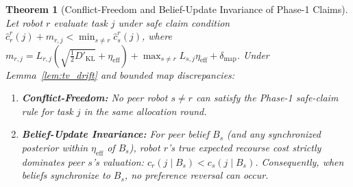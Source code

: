 \documentclass[lettersize,journal]{IEEEtran}
\newtheorem{theorem}{Theorem}
\begin{document}
\begin{theorem}[Conflict-Freedom and Belief-Update Invariance of Phase-1 Claims]
Let robot $r$ evaluate task $j$ under safe claim condition $\hat{c}_r^r(j) + m_{r, j} < \min_{s \ne r} \hat{c}_s^r(j)$, where $m_{r, j} = L_{r, j} (\sqrt{\frac{1}{2} D'_{\text{KL}}} + \eta_{\text{eff}}) + \max_{s \ne r} L_{s, j} \eta_{\text{eff}} + \delta_{\text{map}}$. Under Lemma~\ref{lem:tv_drift} and bounded map discrepancies:
\begin{enumerate}
    \item \textbf{Conflict-Freedom:} No peer robot $s \ne r$ can satisfy the Phase-1 safe-claim rule for task $j$ in the same allocation round.
    \item \textbf{Belief-Update Invariance:} For peer belief $B_s$ (and any synchronized posterior within $\eta_{\text{eff}}$ of $B_s$), robot $r$'s true expected recourse cost strictly dominates peer $s$'s valuation: $c_r(j \mid B_s) < c_s(j \mid B_s)$. Consequently, when beliefs synchronize to $B_s$, no preference reversal can occur.
\end{enumerate}
\label{thm:conflict_freedom}
\end{theorem}
\end{document}
